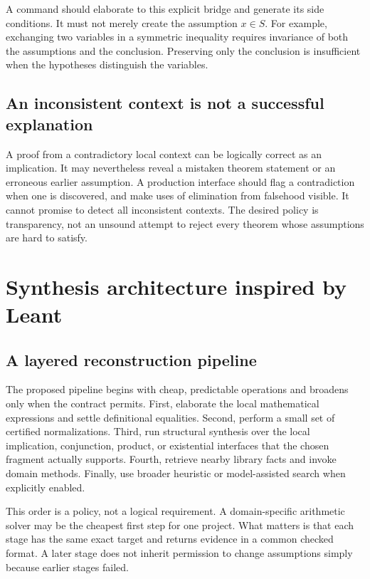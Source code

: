 \documentclass[11pt,a4paper]{article}
\newcommand{\code}[1]{\texttt{\detokenize{#1}}}
\theoremstyle{remark}
\begin{document}
A \code{wlog x in S using reduction} command should elaborate to this explicit bridge and generate its side conditions. It must not merely create the assumption \(x\in S\). For example, exchanging two variables in a symmetric inequality requires invariance of both the assumptions and the conclusion. Preserving only the conclusion is insufficient when the hypotheses distinguish the variables.

\subsection{An inconsistent context is not a successful explanation}

A proof from a contradictory local context can be logically correct as an implication. It may nevertheless reveal a mistaken theorem statement or an erroneous earlier assumption. A production interface should flag a contradiction when one is discovered, and make uses of elimination from falsehood visible. It cannot promise to detect all inconsistent contexts. The desired policy is transparency, not an unsound attempt to reject every theorem whose assumptions are hard to satisfy.

\section{Synthesis architecture inspired by Leant}\label{sec:synthesis}

\subsection{A layered reconstruction pipeline}

The proposed pipeline begins with cheap, predictable operations and broadens only when the contract permits. First, elaborate the local mathematical expressions and settle definitional equalities. Second, perform a small set of certified normalizations. Third, run structural synthesis over the local implication, conjunction, product, or existential interfaces that the chosen fragment actually supports. Fourth, retrieve nearby library facts and invoke domain methods. Finally, use broader heuristic or model-assisted search when explicitly enabled.

This order is a policy, not a logical requirement. A domain-specific arithmetic solver may be the cheapest first step for one project. What matters is that each stage has the same exact target and returns evidence in a common checked format. A later stage does not inherit permission to change assumptions simply because earlier stages failed.
\end{document}
